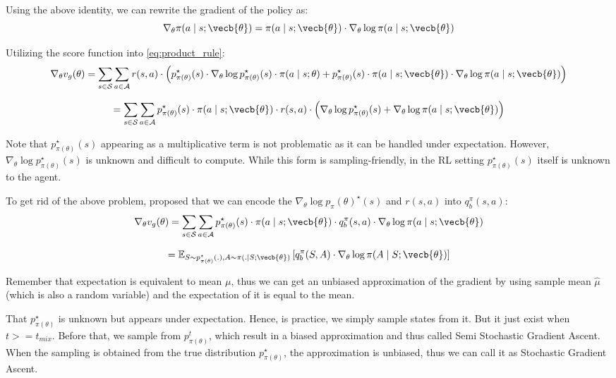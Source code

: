 Using the above identity, we can rewrite the gradient of the policy as:
\begin{equation}
    \nabla_\theta \pi(a \mid s ; \vecb{\theta}) = \pi(a \mid s ; \vecb{\theta}) \cdot \nabla_\theta \log \pi(a \mid s ; \vecb{\theta})
\end{equation}

Utilizing the score function into \eqref{eq:product_rule}:
\begin{equation}
    \nabla_\theta v_g(\theta) = \sum_{s \in \mathcal{S}} \sum_{a \in \mathcal{A}} r(s, a)  \cdot \left( p_{\pi(\theta)}^\star(s) \cdot \nabla_\theta \log{p_{\pi(\theta)}^\star}(s) \cdot \pi(a \mid s; \theta) + p_{\pi(\theta)}^\star(s) \cdot \pi(a \mid s ; \vecb{\theta}) \cdot  \nabla_\theta \log \pi(a \mid s ; \vecb{\theta})\right)
\end{equation}

\begin{equation}
    = \sum_{s \in \mathcal{S}} \sum_{a \in \mathcal{A}}  p_{\pi(\theta)}^\star(s) \cdot \pi(a \mid s ; \vecb{\theta}) \cdot r(s, a)  \cdot \left(\nabla_\theta \log{p_{\pi(\theta)}^\star}(s) + \nabla_\theta \log \pi(a \mid s ; \vecb{\theta})\right)
\end{equation}

Note that $p_{\pi(\theta)}^\star(s)$ appearing as a multiplicative term is not problematic as it can be handled under expectation. However, $\nabla_\theta \log p_{\pi(\theta)}^\star(s)$ is unknown and difficult to compute. While this form is sampling-friendly, in the RL setting $p_{\pi(\theta)}^\star(s)$ itself is unknown to the agent.

To get rid of the above problem, \cite{sutton1999polgradtheorem} proposed that we can encode the $\nabla_\theta \log{p_\pi(\theta)^\star(s)}$ and $r(s,a)$ into $q_b^\pi(s, a)$:
\begin{equation}
    \nabla_\theta v_g(\theta) = \sum_{s \in \mathcal{S}} \sum_{a \in \mathcal{A}}  p_{\pi(\theta)}^\star(s) \cdot \pi(a \mid s ; \vecb{\theta}) \cdot q_b^\pi(s, a) \cdot \nabla_\theta \log \pi(a \mid s ; \vecb{\theta})
\end{equation}

\begin{equation}
     = \mathbb{E}_{S \sim p_{\pi(\theta)}^\star(.), A \sim \pi(. \mid S ; \vecb{\theta})} \left[ q_b^\pi(S, A) \cdot \nabla_\theta \log \pi(A \mid S ; \vecb{\theta})\right]
\end{equation}

Remember that expectation is equivalent to mean $\mu$, thus we can get an unbiased approximation of the gradient by using sample mean $\hat{\mu}$ (which is also a random variable) and the expectation of it is equal to the mean.

That $p_{\pi(\theta)}^\star$ is unknown but appears under expectation. Hence, is practice, we simply sample states from it. 
But it just exist when $t >= t_{mix}$. Before that, we sample from $p_{\pi(\theta)}^t$, which result in a biased approximation and thus called Semi Stochastic Gradient Ascent.   
When the sampling is obtained from the true distribution $p_{\pi(\theta)}^\star$, the approximation is unbiased, thus we can call it as Stochastic Gradient Ascent.

